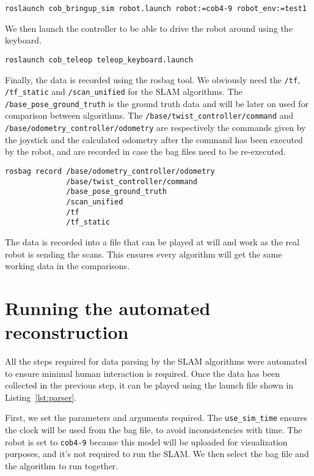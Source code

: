 \begin{verbatim}
roslaunch cob_bringup_sim robot.launch robot:=cob4-9 robot_env:=test1
\end{verbatim}

We then launch the controller to be able to drive the robot around using the keyboard.

\begin{verbatim}
roslaunch cob_teleop teleop_keyboard.launch 
\end{verbatim}

Finally, the data is recorded using the rosbag tool. We obviously need the \texttt{/tf}, \texttt{/tf\_static} and \texttt{/scan\_unified} for the SLAM algorithms. The \texttt{/base\_pose\_ground\_truth} is the ground truth data and will be later on used for comparison between algorithms. The \texttt{/base/twist\_controller/command} and  \texttt{/base/odometry\_controller/odometry} are respectively the commands given by the joystick and the calculated odometry after the command has been executed by the robot, and are recorded in case the bag files need to be re-executed.

\begin{verbatim}
rosbag record /base/odometry_controller/odometry
              /base/twist_controller/command
              /base_pose_ground_truth
              /scan_unified
              /tf
              /tf_static
\end{verbatim}

The data is recorded into a file that can be played at will and work as the real robot is sending the scans. This ensures every algorithm will get the same working data in the comparisons.

\section{Running the automated reconstruction}

All the steps required for data parsing by the SLAM algorithms were automated to ensure minimal human interaction is required. Once the data has been collected in the previous step, it can be played using the launch file shown in Listing~\ref{lst:parser}.

First, we set the parameters and arguments required. The \texttt{use\_sim\_time} ensures the clock will be used from the bag file, to avoid inconsistencies with time. The robot is set to \texttt{cob4-9} because this model will be uploaded for visualization purposes, and it's not required to run the SLAM. We then select the bag file and the algorithm to run together.

